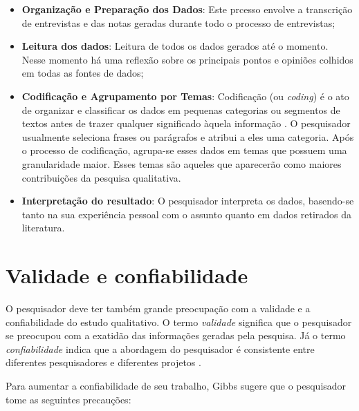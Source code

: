 \begin{itemize}

	\item \textbf{Organização e Preparação dos Dados}: Este prcesso
	envolve a transcrição de entrevistas e das notas geradas durante todo o 
	processo de entrevistas;
	
	\item \textbf{Leitura dos dados}: Leitura de todos os dados gerados até o
	momento. Nesse momento há uma reflexão sobre os principais pontos e opiniões 
	colhidos em todas as fontes de dados;
	
	\item \textbf{Codificação e Agrupamento por Temas}:	Codificação (ou \textit{coding}) é o ato de
	organizar e classificar os dados em pequenas categorias ou segmentos de textos 
	antes de trazer qualquer significado àquela informação \cite{rossman}. O
	pesquisador usualmente seleciona frases ou parágrafos e atribui a eles uma
	categoria. Após o processo de codificação, agrupa-se esses dados em
	temas que possuem uma granularidade maior. Esses temas são aqueles que 
	aparecerão como maiores contribuições da pesquisa qualitativa.
	
	\item \textbf{Interpretação do resultado}: O pesquisador interpreta os dados, 
	basendo-se tanto na sua experiência pessoal com o assunto quanto em dados 
	retirados da literatura.

\end{itemize}

\section{Validade e confiabilidade}

O pesquisador deve ter também grande preocupação com a validade e a
confiabilidade do estudo qualitativo. O termo \textit{validade} significa que o
pesquisador se preocupou com a exatidão das informações geradas pela pesquisa.
Já o termo \textit{confiabilidade} indica que a abordagem do pesquisador é
consistente entre diferentes pesquisadores e diferentes projetos
\cite{gibbs-2007}.

Para aumentar a confiabilidade de seu trabalho, Gibbs \cite{gibbs-2007} sugere
que o pesquisador tome as seguintes precauções:

